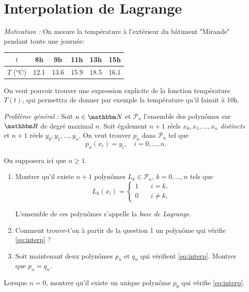 \newpage

\section{Interpolation de Lagrange}

\emph{Motivation :} On mesure la température à l'extérieur du bâtiment "Mirande" pendant toute une journée:

\medskip

\begin{center}
\begin{tabular}{c|c|c|c|c|c}
$t$ & 8h & 9h & 11h & 13h & 15h \\ \hline
$T$ ($^o$C) & 12.1 & 13.6 & 15.9 & 18.5 & 16.1 
\end{tabular}
\end{center}

On veut pouvoir trouver une expression explicite de la fonction température $T(t)$, qui permettra de donner par exemple la température qu'il faisait à 10h.

\medskip

\emph{Problème général :} Soit $n\in\eN$ et $\mathcal{P}_n$ l'ensemble des polynômes sur $\eR$  de degré maximal $n$. Soit également $n+1$ réels $x_0,x_1,\ldots,x_n$ \emph{distincts} et $n+1$ réels $y_0,y_1,\ldots,y_n$. On veut trouver $p_n$ dans $\mathcal{P}_n$ tel que
\begin{equation} \label{eq:interp}
p_n(x_i)=y_i,\quad i=0,\ldots,n.
\end{equation}

\medskip

\begin{exercice} 

On supposera ici que $n\geq1$. 

\begin{enumerate}

\item Montrer qu'il existe $n+1$ polyn\^omes $L_k \in \mathcal{P}_n$, $k=0,\ldots,n$ tels que
\[
L_k(x_i) = \left \{ \begin{array}{ll}
1 & \quad i=k,\\
0 & \quad i\neq k,
\end{array} \right.
\]

L'ensemble de ces polynômes s'appelle la \emph{base de Lagrange}.

\item Comment trouve-t'on à partir de la question 1 un polynôme qui vérifie \eqref{eq:interp} ?

\item Soit maintenant deux polynômes $p_n$ et $q_n$ qui vérifient \eqref{eq:interp}. Montrer que $p_n=q_n$.

\end{enumerate}

Lorsque $n=0$, montrer qu'il existe un unique polynôme $p_0$ qui vérifie \eqref{eq:interp}.

\end{exercice}

